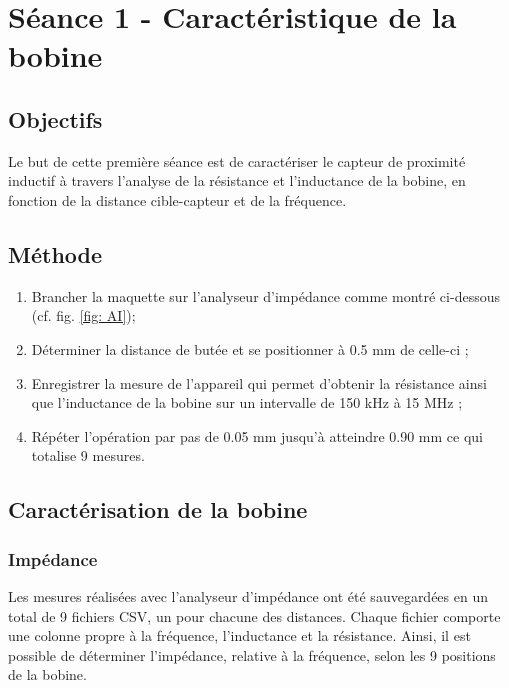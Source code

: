 

\section{Séance 1 - Caractéristique de la bobine }

\subsection{Objectifs}

Le but de cette première séance est de caractériser le capteur de proximité inductif à travers 
l’analyse de la résistance et l'inductance de la bobine, en fonction de la distance cible-capteur 
 et de la fréquence. 

\subsection{Méthode}

\begin{enumerate}
    \item Brancher la maquette sur l'analyseur d'impédance comme montré ci-dessous (cf. fig. \ref{fig: AI});
    \item Déterminer la distance de butée et se positionner à 0.5 mm de celle-ci ;
    \item Enregistrer la mesure de l'appareil qui permet d'obtenir la résistance ainsi que l'inductance de 
    la bobine sur un intervalle de 150 kHz à 15 MHz ;
    \item Répéter l'opération par pas de 0.05 mm jusqu'à atteindre 0.90 mm ce qui totalise 9 mesures.
\end{enumerate}


\subsection{Caractérisation de la bobine}

\subsubsection{Impédance}


Les mesures réalisées avec l'analyseur d'impédance ont été sauvegardées en un total
de 9 fichiers CSV, un pour chacune des distances. Chaque fichier comporte une colonne propre à
la fréquence, l'inductance et la résistance. Ainsi, il est possible de déterminer l'impédance, relative
à la fréquence, selon les 9 positions de la bobine.\\


